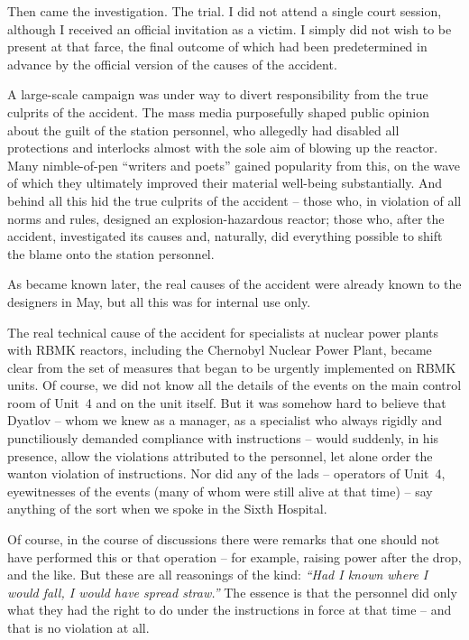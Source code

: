 \documentclass[openright]{bookest}
\begin{document}
Then came the investigation. The trial. I did not attend a single court session, although I received an official invitation as a victim. I simply did not wish to be present at that farce, the final outcome of which had been predetermined in advance by the official version of the causes of the accident.

A large-scale campaign was under way to divert responsibility from the true culprits of the accident. The mass media purposefully shaped public opinion about the guilt of the station personnel, who allegedly had disabled all protections and interlocks almost with the sole aim of blowing up the reactor. Many nimble-of-pen ``writers and poets'' gained popularity from this, on the wave of which they ultimately improved their material well-being substantially. And behind all this hid the true culprits of the accident -- those who, in violation of all norms and rules, designed an explosion-hazardous reactor; those who, after the accident, investigated its causes and, naturally, did everything possible to shift the blame onto the station personnel.

As became known later, the real causes of the accident were already known to the designers in May, but all this was for internal use only.

The real technical cause of the accident for specialists at nuclear power plants with RBMK reactors, including the Chernobyl Nuclear Power Plant, became clear from the set of measures that began to be urgently implemented on RBMK units. Of course, we did not know all the details of the events on the main control room of Unit~4 and on the unit itself. But it was somehow hard to believe that Dyatlov -- whom we knew as a manager, as a specialist who always rigidly and punctiliously demanded compliance with instructions -- would suddenly, in his presence, allow the violations attributed to the personnel, let alone order the wanton violation of instructions. Nor did any of the lads -- operators of Unit~4, eyewitnesses of the events (many of whom were still alive at that time) -- say anything of the sort when we spoke in the Sixth Hospital.

Of course, in the course of discussions there were remarks that one should not have performed this or that operation -- for example, raising power after the drop, and the like. But these are all reasonings of the kind: \textit{``Had I known where I would fall, I would have spread straw.''} The essence is that the personnel did only what they had the right to do under the instructions in force at that time -- and that is no violation at all.
\end{document}
